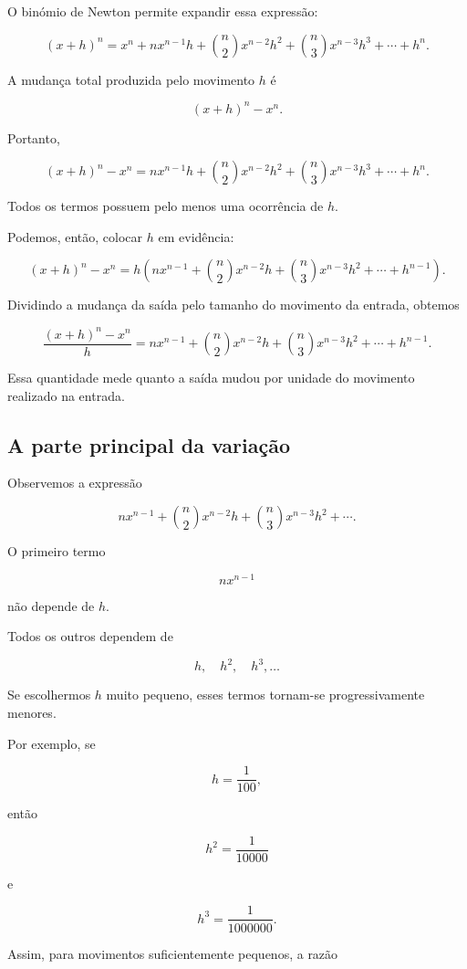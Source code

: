 \documentclass[12pt,a4paper]{article}
\begin{document}
O binómio de Newton permite expandir essa expressão:

\[
(x+h)^n
=
x^n
+
nx^{n-1}h
+
\binom{n}{2}x^{n-2}h^2
+
\binom{n}{3}x^{n-3}h^3
+\cdots
+h^n.
\]

A mudança total produzida pelo movimento \(h\) é

\[
(x+h)^n-x^n.
\]

Portanto,

\[
(x+h)^n-x^n
=
nx^{n-1}h
+
\binom{n}{2}x^{n-2}h^2
+
\binom{n}{3}x^{n-3}h^3
+\cdots
+h^n.
\]

Todos os termos possuem pelo menos uma ocorrência de \(h\).

Podemos, então, colocar \(h\) em evidência:

\[
(x+h)^n-x^n
=
h
\left(
nx^{n-1}
+
\binom{n}{2}x^{n-2}h
+
\binom{n}{3}x^{n-3}h^2
+\cdots
+h^{n-1}
\right).
\]

Dividindo a mudança da saída pelo tamanho do movimento da entrada,
obtemos

\[
\frac{(x+h)^n-x^n}{h}
=
nx^{n-1}
+
\binom{n}{2}x^{n-2}h
+
\binom{n}{3}x^{n-3}h^2
+\cdots
+h^{n-1}.
\]

Essa quantidade mede quanto a saída mudou por unidade do movimento
realizado na entrada.

\subsection{A parte principal da variação}

Observemos a expressão

\[
nx^{n-1}
+
\binom{n}{2}x^{n-2}h
+
\binom{n}{3}x^{n-3}h^2
+\cdots.
\]

O primeiro termo

\[
nx^{n-1}
\]

não depende de \(h\).

Todos os outros dependem de

\[
h,\quad h^2,\quad h^3,\ldots
\]

Se escolhermos \(h\) muito pequeno, esses termos tornam-se
progressivamente menores.

Por exemplo, se

\[
h=\frac{1}{100},
\]

então

\[
h^2=\frac{1}{10000}
\]

e

\[
h^3=\frac{1}{1000000}.
\]

Assim, para movimentos suficientemente pequenos, a razão
\end{document}
